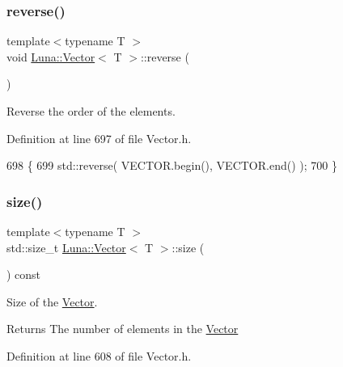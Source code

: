 \subsubsection{\texorpdfstring{reverse()}{reverse()}}
{\footnotesize\ttfamily template$<$typename T $>$ \\
void \hyperlink{classLuna_1_1Vector}{Luna\+::\+Vector}$<$ T $>$\+::reverse (\begin{DoxyParamCaption}{ }\end{DoxyParamCaption})\hspace{0.3cm}{\ttfamily [inline]}}



Reverse the order of the elements. 



Definition at line 697 of file Vector.\+h.


\begin{DoxyCode}
698   \{
699     std::reverse( VECTOR.begin(), VECTOR.end() );
700   \}
\end{DoxyCode}
\mbox{\label{classLuna_1_1Vector_ac9b6ed7a0df401728f27c193fbc8f4d8}} 
\subsubsection{\texorpdfstring{size()}{size()}}
{\footnotesize\ttfamily template$<$typename T $>$ \\
std\+::size\+\_\+t \hyperlink{classLuna_1_1Vector}{Luna\+::\+Vector}$<$ T $>$\+::size (\begin{DoxyParamCaption}{ }\end{DoxyParamCaption}) const\hspace{0.3cm}{\ttfamily [inline]}}



Size of the \hyperlink{classLuna_1_1Vector}{Vector}. 

\begin{DoxyReturn}{Returns}
The number of elements in the \hyperlink{classLuna_1_1Vector}{Vector} 
\end{DoxyReturn}


Definition at line 608 of file Vector.\+h.



